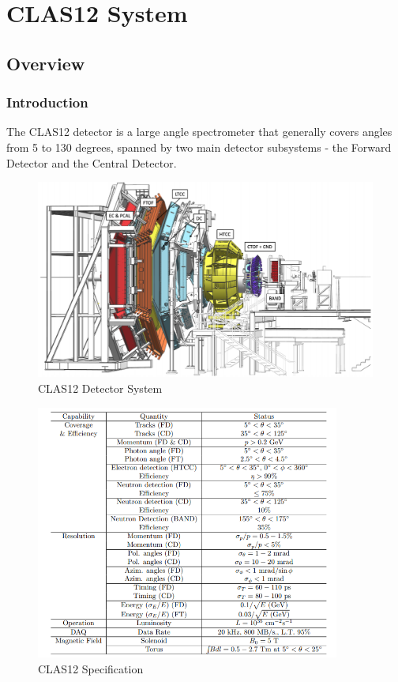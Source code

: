 \chapter{CLAS12 System}
    \section{Overview}
        \subsection{Introduction}
            The CLAS12 detector is a large angle spectrometer that generally covers angles from 5 to 130 degrees, spanned by two main detector subsystems - the Forward Detector and the Central Detector.
            
                
    		\begin{figure}[H]
    			\centering
    			\includegraphics[width=12cm]{CLAS-12/modules/clas-12-system/pics/other/CLA12.PNG}
    			\caption{ CLAS12 Detector System }
			\end{figure}
			
        	\begin{figure}[H]
    			\centering
    			\includegraphics[width=10cm]{CLAS-12/modules/clas-12-system/pics/other/clas12-params.PNG}
    			\caption{CLAS12 Specification}
			\end{figure}
		
